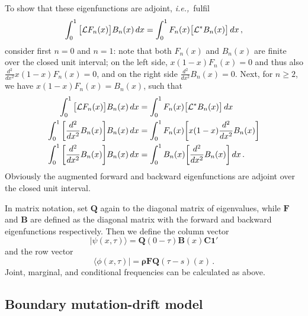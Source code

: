 \documentclass[preprint]{elsarticle}
\newcommand{\bs}[1]{\ensuremath{\boldsymbol{#1}}}
\newcommand\ie{{\it i.e.,}}
\newcommand\oneC{\ensuremath{\mathbf{1}'}}
\begin{document}
To show that these eigenfunctions are adjoint, \ie\ fulfil
\begin{equation}\label{eq:adjoint_pure_drift}
\int_{0}^{1} \big[{\cal L} F_n(x)\big] B_n(x)\,dx=
\int_{0}^{1} F_n(x) \big[{\cal L}^{*} B_n(x)\big]\,dx\,,
\end{equation}
consider first $n=0$ and $n=1$: note that both $F_n(x)$ and $B_n(x)$ are finite over the closed unit interval; on the left side, $x(1-x)F_n(x)=0$ and thus also $\frac{d^2}{dx^2}x(1-x)F_n(x)=0$, and on the right side $\frac{d^2}{dx^2}B_n(x)=0$. Next, for $n\geq 2$, we have $x(1-x)F_n(x)=B_n(x)$, such that
\begin{equation}
\begin{split}
\int_{0}^{1} \big[{\cal L} F_n(x)\big] B_n(x)\,dx&=
\int_{0}^{1} F_n(x) \big[{\cal L}^{*} B_n(x)\big]\,dx\\
\int_{0}^{1} \bigg[\frac{d^2}{dx^2} B_n(x)\bigg] B_n(x)\,dx&=
\int_{0}^{1} F_n(x) \bigg[ x(1-x) \frac{d^2}{dx^2} B_n(x)\bigg]\\
\int_{0}^{1} \bigg[\frac{d^2}{dx^2} B_n(x)\bigg] B_n(x)\,dx&=
\int_{0}^{1} B_n(x) \bigg[ \frac{d^2}{dx^2} B_n(x)\bigg]\,dx\,.
\end{split}
\end{equation}
Obviously the augmented forward and backward eigenfunctions are adjoint over the closed unit interval. %

In matrix notation, set $\mathbf{Q}$ again to the diagonal matrix of eigenvalues, while  $\mathbf{F}$ and $\mathbf{B}$ are defined as the diagonal matrix with the forward and  backward eigenfunctions respectively. Then we define the column vector
\begin{equation}
|\psi(x,\tau)\rangle=\mathbf{Q}(0-\tau)\mathbf{B}(x)\mathbf{C}\oneC
\end{equation}
and the row vector
\begin{equation}
\langle\phi(x,\tau)|=\bs{\rho}\mathbf{F}\mathbf{Q}(\tau-s)(x)\,.
\end{equation}
Joint, marginal, and conditional frequencies can be calculated as above. 

\subsection{Boundary mutation-drift model}
\end{document}

